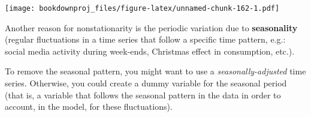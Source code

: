 \documentclass[
]{article}
\newenvironment{Shaded}{\begin{snugshade}}{\end{snugshade}}
\newcommand{\DataTypeTok}[1]{\textcolor[rgb]{0.13,0.29,0.53}{#1}}
\newcommand{\DecValTok}[1]{\textcolor[rgb]{0.00,0.00,0.81}{#1}}
\newcommand{\KeywordTok}[1]{\textcolor[rgb]{0.13,0.29,0.53}{\textbf{#1}}}
\newcommand{\NormalTok}[1]{#1}
\newcommand{\OperatorTok}[1]{\textcolor[rgb]{0.81,0.36,0.00}{\textbf{#1}}}
\newcommand{\OtherTok}[1]{\textcolor[rgb]{0.56,0.35,0.01}{#1}}
\newcommand{\StringTok}[1]{\textcolor[rgb]{0.31,0.60,0.02}{#1}}
\begin{document}
\begin{Shaded}
\end{Shaded}

\texttt{[image: bookdownproj\_files/figure-latex/unnamed-chunk-162-1.pdf]}

Another reason for nonstationarity is the periodic variation due to \textbf{seasonality} (regular fluctuations in a time series that follow a specific time pattern, e.g.: social media activity during week-ends, Christmas effect in consumption, etc.).

To remove the seasonal pattern, you might want to use a \emph{seasonally-adjusted} time series. Otherwise, you could create a dummy variable for the seasonal period (that is, a variable that follows the seasonal pattern in the data in order to account, in the model, for these fluctuations).
\end{document}
